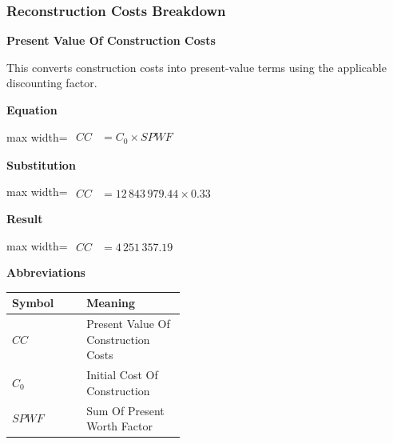 \documentclass{article}
\begin{document}
\subsubsection{Reconstruction Costs Breakdown}
\vspace{0.4em}
\textbf{Present Value Of Construction Costs}\par\vspace{-0.35em}
This converts construction costs into present-value terms using the applicable discounting factor.

\vspace{0.4em}
\textbf{Equation}\par\vspace{-0.35em}
\begin{center}
\begin{adjustbox}{max width=\linewidth}
$\displaystyle\begin{aligned}
CC &= C_0 \times SPWF
\end{aligned}$
\end{adjustbox}
\end{center}
\vspace{0.4em}
\textbf{Substitution}\par\vspace{-0.35em}
\begin{center}
\begin{adjustbox}{max width=\linewidth}
$\displaystyle\begin{aligned}
CC &= 12\,843\,979.44 \times 0.33
\end{aligned}$
\end{adjustbox}
\end{center}
\vspace{0.4em}
\textbf{Result}\par\vspace{-0.35em}
\begin{center}
\begin{adjustbox}{max width=\linewidth}
$\displaystyle\begin{aligned}
CC &= 4\,251\,357.19
\end{aligned}$
\end{adjustbox}
\end{center}
\vspace{0.4em}
\textbf{Abbreviations}\par\vspace{-0.35em}
\begin{tabularx}{\linewidth}{>{\raggedright\arraybackslash}p{0.43\linewidth} >{\raggedright\arraybackslash}X}
\toprule
Symbol & Meaning \\
\midrule
$CC$ & Present Value Of Construction Costs \\
$C_0$ & Initial Cost Of Construction \\
$SPWF$ & Sum Of Present Worth Factor \\
\bottomrule
\end{tabularx}
\end{document}
